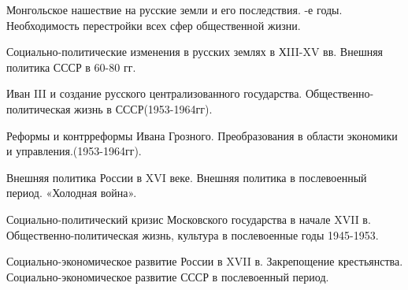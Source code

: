 \documentclass[
	14pt,
	a4paper,
	]
	{scrartcl}
\begin{document}
\vfill
\z 	Монгольское нашествие на русские земли и его последствия.
 \vfill
{}-е годы. Необходимость перестройки всех сфер общественной жизни.
 \vfill

\vfill

\newpage


\shapk
{}
\setcounter{zad}{0}

\vfill
\z 	Социально-политические изменения в русских землях в ХIII-XV вв.
 \vfill
\z 	Внешняя политика СССР в 60-80 гг.
 \vfill

\vfill

\newpage


\shapk
{}
\setcounter{zad}{0}

\vfill
\z 	Иван III и создание русского централизованного государства.
 \vfill
\z 	Общественно-политическая жизнь в СССР(1953-1964гг).
 \vfill

\vfill

\newpage


\shapk
{}
\setcounter{zad}{0}

\vfill
\z 	Реформы и  контрреформы Ивана Грозного.
 \vfill
\z 	Преобразования в области экономики и управления.(1953-1964гг).
 \vfill

\vfill

\newpage


\shapk
{}
\setcounter{zad}{0}

\vfill
\z 	Внешняя политика России в XVI веке.
 \vfill
\z 	Внешняя политика в послевоенный период. «Холодная война».
 \vfill

\vfill

\newpage


\shapk
{}
\setcounter{zad}{0}

\vfill
\z 	Социально-политический кризис Московского государства в начале XVII в.
 \vfill
\z 	Общественно-политическая жизнь, культура в послевоенные годы 1945-1953.
 \vfill

\vfill

\newpage


\shapk
{}
\setcounter{zad}{0}

\vfill
\z 	Социально-экономическое развитие России в XVII в. Закрепощение крестьянства.
 \vfill
\z 	Социально-экономическое развитие СССР в послевоенный период.
 \vfill

\vfill

\newpage


\shapk
{}
\setcounter{zad}{0}
\end{document}

